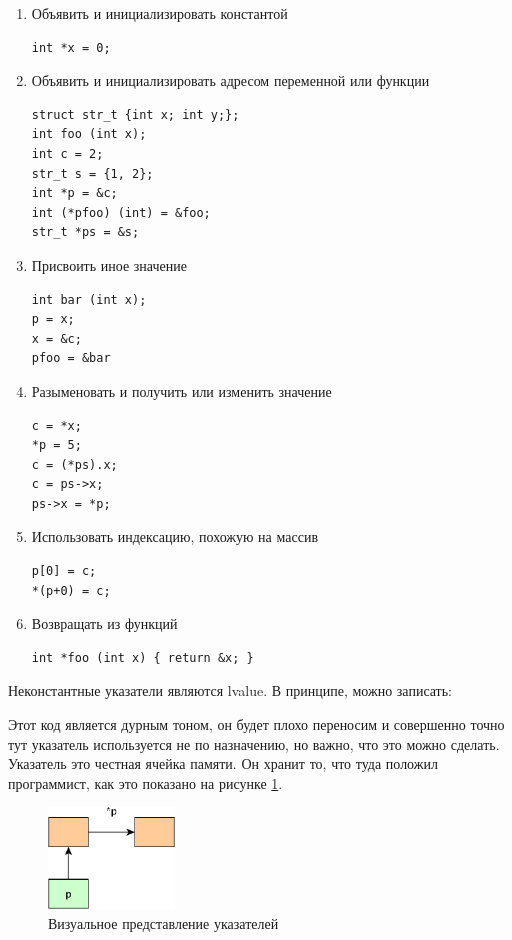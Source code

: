 \documentclass[a4paper,12pt,oneside]{article}
\begin{document}
\begin{enumerate}
\item Объявить и инициализировать константой
\begin{lstlisting}
int *x = 0;
\end{lstlisting}
\item Объявить и инициализировать адресом переменной или функции
\begin{lstlisting}
struct str_t {int x; int y;};
int foo (int x);
int c = 2;
str_t s = {1, 2};
int *p = &c;
int (*pfoo) (int) = &foo;
str_t *ps = &s;
\end{lstlisting}
\item Присвоить иное значение
\begin{lstlisting}
int bar (int x);
p = x;
x = &c;
pfoo = &bar
\end{lstlisting}
\item Разыменовать и получить или изменить значение
\begin{lstlisting}
c = *x;
*p = 5;
c = (*ps).x;
c = ps->x;
ps->x = *p;
\end{lstlisting}
\item Использовать индексацию, похожую на массив
\begin{lstlisting}
p[0] = c;
*(p+0) = c;
\end{lstlisting}
\item Возвращать из функций
\begin{lstlisting}
int *foo (int x) { return &x; }
\end{lstlisting}
\end{enumerate}

Неконстантные указатели являются lvalue. В принципе, можно записать:



Этот код является дурным тоном, он будет плохо переносим и совершенно точно тут указатель используется не по назначению, но важно, что это можно сделать. Указатель это честная ячейка памяти. Он хранит то, что туда положил программист, как это показано на рисунке \ref{fig:pointers}.

\begin{figure}[h!]
\centering
\includegraphics[width=0.3\textwidth]{illustrations/pointers-crop.pdf}
\caption{Визуальное представление указателей}
\label{fig:pointers}
\end{figure}
\end{document}
